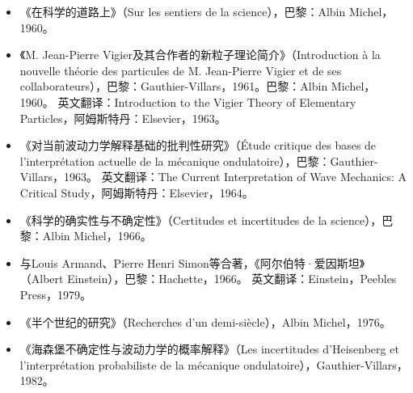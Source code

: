 \begin{itemize}
\item 《在科学的道路上》（Sur les sentiers de la science），巴黎：Albin Michel，1960。
\item 《M. Jean-Pierre Vigier及其合作者的新粒子理论简介》（Introduction à la nouvelle théorie des particules de M. Jean-Pierre Vigier et de ses collaborateurs），巴黎：Gauthier-Villars，1961。巴黎：Albin Michel，1960。
  英文翻译：Introduction to the Vigier Theory of Elementary Particles，阿姆斯特丹：Elsevier，1963。
\item 《对当前波动力学解释基础的批判性研究》（Étude critique des bases de l'interprétation actuelle de la mécanique ondulatoire），巴黎：Gauthier-Villars，1963。
  英文翻译：The Current Interpretation of Wave Mechanics: A Critical Study，阿姆斯特丹：Elsevier，1964。
\item 《科学的确实性与不确定性》（Certitudes et incertitudes de la science），巴黎：Albin Michel，1966。
\item 与Louis Armand、Pierre Henri Simon等合著，《阿尔伯特·爱因斯坦》（Albert Einstein），巴黎：Hachette，1966。
  英文翻译：Einstein，Peebles Press，1979。
\item 《半个世纪的研究》（Recherches d'un demi-siècle），Albin Michel，1976。
\item 《海森堡不确定性与波动力学的概率解释》（Les incertitudes d'Heisenberg et l'interprétation probabiliste de la mécanique ondulatoire），Gauthier-Villars，1982。
\end{itemize}
